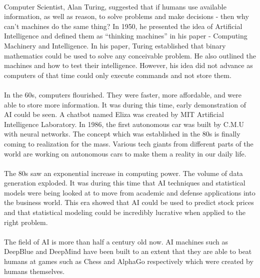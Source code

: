\documentclass[12pt]{article}
\begin{document}
\paragraph{}
Computer Scientist, Alan Turing, suggested that if humans use available information, as well as reason, to solve problems and make decisions - then why can’t machines do the same thing? In 1950, he presented the idea of Artificial Intelligence and defined them as “thinking machines” in his paper - Computing Machinery and Intelligence. In his paper, Turing established that binary mathematics could be used to solve any conceivable problem.\cite{A. M. TURING} He also outlined the machines and how to test their intelligence. However, his idea did not advance as computers of that time could only execute commands and not store them.

\paragraph{}
In the 60s, computers flourished. They were faster, more affordable, and were able to store more information. It was during this time, early demonstration of AI could be seen. A chatbot named Eliza was created by MIT Artificial Intelligence Laboratory. In 1986, the first autonomous car was built by C.M.U with neural networks. The concept which was established in the 80s is finally coming to realization for the mass. Various tech giants from different parts of the world are working on autonomous cars to make them a reality in our daily life. 

\paragraph{}
The 80s saw an exponential increase in computing power. The volume of data generation exploded. It was during this time that AI techniques and statistical models were being looked at to move from academic and defense applications into the business world. This era showed that AI could be used to predict stock prices and that statistical modeling could be incredibly lucrative when applied to the right problem.

\paragraph{}
The field of AI is more than half a century old now. AI machines such as DeepBlue\cite{DeepBlue} and DeepMind\cite{DeepMind} have been built to an extent that they are able to beat humans at games such as Chess and AlphaGo respectively which were created by humans themselves.
\end{document}
